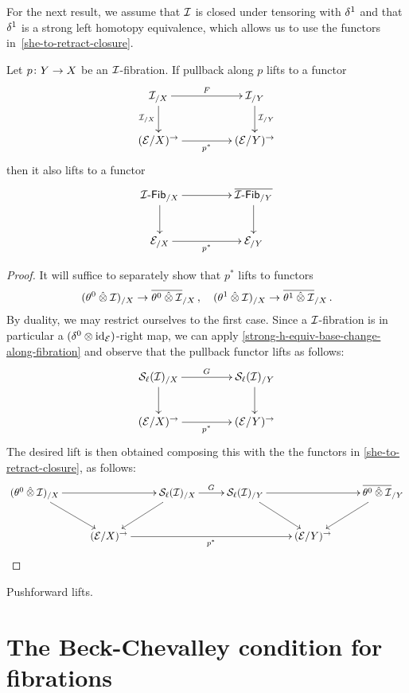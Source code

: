 \documentclass[reqno,10pt,a4paper,oneside]{amsart}
\begin{document}
For the next result, we assume that $\cal{I}$ is closed under tensoring with $\rcyl$ and  that $\rcyl$ is a strong left homotopy equivalence,
which allows us to use the functors in~\eqref{she-to-retract-closure}.

\begin{theorem}
Let $p \co Y \to X$ be an $\cal{I}$-fibration. If pullback along $p$ lifts to a functor
\[
\xymatrix@C+2em{
  \cal{I}_{/X}
  \ar[r]^{F}
  \ar[d]_{\cal{I}_{/X}}
&
  \cal{I}_{/Y}
  \ar[d]^{\cal{I}_{/Y}}
\\
  (\catE / X)^{\to}
  \ar[r]_{p^*}
&
  (\catE / Y)^{\to}
}
\]
then it also lifts to a functor 
\[
\xymatrix@C+2em{
\cal{I}\text{-}\Fib_{/X} \ar[r] \ar[d] &  \overline{\cal{I}\text{-}\Fib_{/Y}}\ar[d] \\ 
\cal{E}_{/X} \ar[r]_{p^*} & \cal{E}_{/Y}
}
\]
\end{theorem}

\begin{proof}
It will suffice to separately show that $p^*$ lifts to functors 
\[
 (\thetal \hatotimes \cal{I})_{/X} \to \overline{\thetal \hatotimes \cal{I}}_{/X} \, , \quad
 (\thetar \hatotimes \cal{I})_{/X} \to \overline{\thetar \hatotimes \cal{I}}_{/X} \, .
 \]
By duality, we may restrict ourselves to the first case. Since a $\cal{I}$-fibration is in particular a $(\lcyl \otimes \id_\catE)$-right map,
we can apply  \cref{strong-h-equiv-base-change-along-fibration} and observe that the pullback functor lifts as follows:
\[
\xymatrix@C+2em{
  \cal{S}_\ell(\cal{I})_{/X}
  \ar[r]^{G}
  \ar[d]
&
  \cal{S}_\ell(\cal{I})_{/Y}
  \ar[d] \\
  (\catE / X)^{\to}
  \ar[r]_{p^*}
&
  (\catE / Y)^{\to}
}
\]
 The desired lift is then obtained composing this with the the functors in \eqref{she-to-retract-closure}, as follows:
\[
\xymatrix{
  (\thetal \hatotimes \cal{I})_{/X} 
  \ar[rr]
  \ar[dr] & 
&
  \cal{S}_\ell(\cal{I})_{/X}
  \ar[r]^G 
  \ar[dl]
&
  \cal{S}_\ell(\cal{I})_{/Y}
  \ar[rr]
  \ar[dr]
& &
  \overline{\thetal \hatotimes \cal{I}}_{/Y}
  \ar[dl]
\\ & 
  (\catE/X)^{\to}
  \ar[rrr]_{p^*}
&&&
  (\catE/Y)^{\to} & 
} 
\] \qedhere
\end{proof}

\begin{corollary}
Pushforward lifts.
\end{corollary}



\section{The Beck-Chevalley condition for fibrations}
\end{document}
